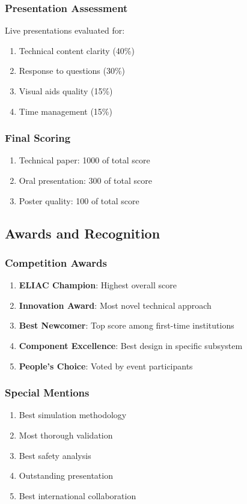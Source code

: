 \subsubsection{Presentation Assessment}
Live presentations evaluated for:
\begin{enumerate}[noitemsep]
    \item Technical content clarity (40\%)
    \item Response to questions (30\%)
    \item Visual aids quality (15\%)
    \item Time management (15\%)
\end{enumerate}

\subsubsection{Final Scoring}
\begin{enumerate}[noitemsep]
    \item Technical paper: 1000 of total score
    \item Oral presentation: 300 of total score
    \item Poster quality: 100 of total score
\end{enumerate}

\subsection{Awards and Recognition}

\subsubsection{Competition Awards}
\begin{enumerate}[noitemsep]
    \item \textbf{ELIAC Champion}: Highest overall score
    \item \textbf{Innovation Award}: Most novel technical approach
    \item \textbf{Best Newcomer}: Top score among first-time institutions
    \item \textbf{Component Excellence}: Best design in specific subsystem
    \item \textbf{People's Choice}: Voted by event participants
\end{enumerate}

\subsubsection{Special Mentions}
\begin{enumerate}[noitemsep]
    \item Best simulation methodology
    \item Most thorough validation
    \item Best safety analysis
    \item Outstanding presentation
    \item Best international collaboration
\end{enumerate}

